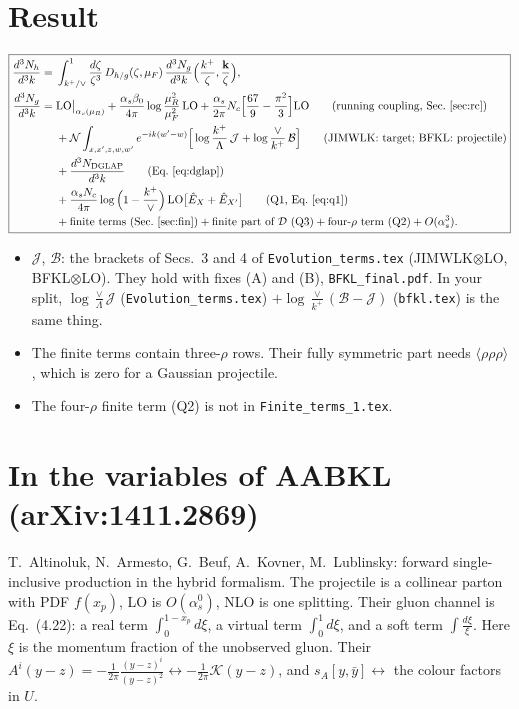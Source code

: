 \documentclass[9pt]{article}
\newcommand{\KK}{\mathcal K}
\numberwithin{equation}{section}
\begin{document}
\section{Result}\label{sec:res}
\begin{equation}
\boxed{\begin{aligned}
\frac{d^3N_h}{d^3k}={}&\int_{k^+/\vee}^1\frac{d\zeta}{\zeta^3}\,D_{h/g}(\zeta,\mu_F)\,\frac{d^3N_g}{d^3k}\Big(\frac{k^+}{\zeta},\frac{\mathbf k}{\zeta}\Big),\\
\frac{d^3N_g}{d^3k}={}&{\rm LO}\big|_{\alpha_s(\mu_R)}+\frac{\alpha_s\beta_0}{4\pi}\log\frac{\mu_R^2}{\mu_F^2}\,{\rm LO}+\frac{\alpha_s}{2\pi}N_c\Big[\frac{67}{9}-\frac{\pi^2}{3}\Big]{\rm LO}\qquad\text{(running coupling, Sec.~\ref{sec:rc})}\\
&+\mathcal N\int_{x,x',z,w,w'}e^{-ik(w'-w)}\Big[\log\frac{k^+}{\Lambda}\,\mathcal J+\log\frac{\vee}{k^+}\,\mathcal B\Big]\qquad\text{(JIMWLK: target; BFKL: projectile)}\\
&+\frac{d^3N_{\rm DGLAP}}{d^3k}\qquad\text{(Eq.~\eqref{eq:dglap})}\\
&+\frac{\alpha_sN_c}{4\pi}\log\Big(1-\frac{k^+}{\vee}\Big)\,{\rm LO}\big[\hat E_X+\hat E_{X'}\big]\qquad\text{(Q1, Eq.~\eqref{eq:q1})}\\
&+\text{finite terms (Sec.~\ref{sec:fin})}+\text{finite part of }\mathcal D\text{ (Q3)}+\text{four-}\rho\text{ term (Q2)}+O(\alpha_s^3).
\end{aligned}}
\label{eq:result}
\end{equation}
\begin{itemize}
\item $\mathcal J$, $\mathcal B$: the brackets of Secs.~3 and 4 of \texttt{Evolution\_terms.tex} (JIMWLK$\otimes$LO, BFKL$\otimes$LO). They hold with fixes (A) and (B), \texttt{BFKL\_final.pdf}. In your split, $\log\frac{\vee}{\Lambda}\mathcal J$ (\texttt{Evolution\_terms.tex}) $+\log\frac{\vee}{k^+}(\mathcal B-\mathcal J)$ (\texttt{bfkl.tex}) is the same thing.
\item The finite terms contain three-$\rho$ rows. Their fully symmetric part needs $\langle\rho\rho\rho\rangle$, which is zero for a Gaussian projectile.
\item The four-$\rho$ finite term (Q2) is not in \texttt{Finite\_terms\_1.tex}.
\end{itemize}

\section{In the variables of AABKL (arXiv:1411.2869)}\label{sec:aabkl}
T.~Altinoluk, N.~Armesto, G.~Beuf, A.~Kovner, M.~Lublinsky: forward single-inclusive production in the hybrid formalism. The projectile is a collinear parton with PDF $f(x_p)$, LO is $O(\alpha_s^0)$, NLO is one splitting. Their gluon channel is Eq.~(4.22): a real term $\int_0^{1-x_p}d\xi$, a virtual term $\int_0^1d\xi$, and a soft term $\int\frac{d\xi}{\xi}$. Here $\xi$ is the momentum fraction of the unobserved gluon. Their $A^i(y-z)=-\frac{1}{2\pi}\frac{(y-z)^i}{(y-z)^2}\leftrightarrow-\frac{1}{2\pi}\KK(y-z)$, and $s_A[y,\bar y]\leftrightarrow$ the colour factors in $U$.
\end{document}
